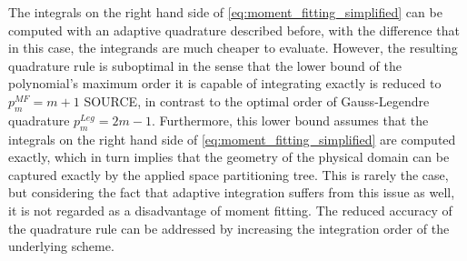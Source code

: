 The integrals on the right hand side of \ref{eq:moment_fitting_simplified} can be computed with an adaptive quadrature described before, with the difference that in this case, the integrands are much cheaper to evaluate. However, the resulting quadrature rule is suboptimal in the sense that the lower bound of the polynomial's maximum order it is capable of integrating exactly is reduced to $p_m^{MF}=m+1$ \cite{} SOURCE, in contrast to the optimal order of Gauss-Legendre quadrature $p_m^{Leg}=2m-1$.
Furthermore, this lower bound assumes that the integrals on the right hand side of \ref{eq:moment_fitting_simplified} are computed exactly, which in turn implies that the geometry of the physical domain can be captured exactly by the applied space partitioning tree. This is rarely the case, but considering the fact that adaptive integration suffers from this issue as well, it is not regarded as a disadvantage of moment fitting. The reduced accuracy of the quadrature rule can be addressed by increasing the integration order of the underlying scheme.

